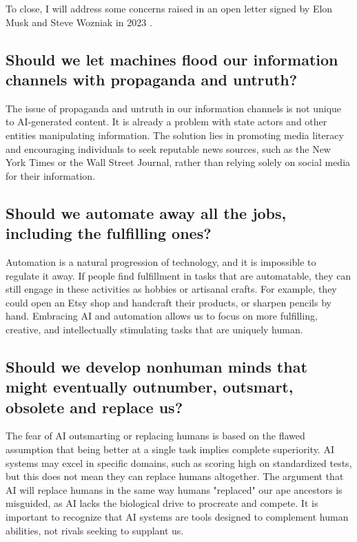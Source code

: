 To close, I will address some concerns raised in an open letter signed by Elon Musk and Steve Wozniak in 2023 .

\subsection{Should we let machines flood our information channels with propaganda and untruth?}

The issue of propaganda and untruth in our information channels is not unique to AI-generated content. It is already a problem with state actors and other entities manipulating information. The solution lies in promoting media literacy and encouraging individuals to seek reputable news sources, such as the New York Times or the Wall Street Journal, rather than relying solely on social media for their information.

\subsection{Should we automate away all the jobs, including the fulfilling ones?}

Automation is a natural progression of technology, and it is impossible to regulate it away. If people find fulfillment in tasks that are automatable, they can still engage in these activities as hobbies or artisanal crafts. For example, they could open an Etsy shop and handcraft their products, or sharpen pencils by hand. Embracing AI and automation allows us to focus on more fulfilling, creative, and intellectually stimulating tasks that are uniquely human.

\subsection{Should we develop nonhuman minds that might eventually outnumber, outsmart, obsolete and replace us?}

The fear of AI outsmarting or replacing humans is based on the flawed assumption that being better at a single task implies complete superiority. AI systems may excel in specific domains, such as scoring high on standardized tests, but this does not mean they can replace humans altogether. The argument that AI will replace humans in the same way humans "replaced" our ape ancestors is misguided, as AI lacks the biological drive to procreate and compete. It is important to recognize that AI systems are tools designed to complement human abilities, not rivals seeking to supplant us.

